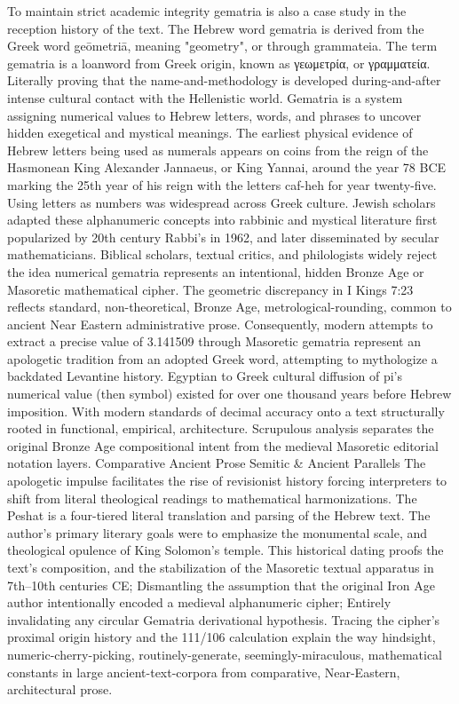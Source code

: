 To maintain strict academic integrity gematria is also a case study in the reception history of the text. The Hebrew word gematria is derived from the Greek word geōmetriā, meaning "geometry", or through grammateia. The term gematria is a loanword from Greek origin, known as γεωμετρία, or γραμματεία. Literally proving that the name-and-methodology is developed during-and-after intense cultural contact with the Hellenistic world. Gematria is a system assigning numerical values to Hebrew letters, words, and phrases to uncover hidden exegetical and mystical meanings. The earliest physical evidence of Hebrew letters being used as numerals appears on coins from the reign of the Hasmonean King Alexander Jannaeus, or King Yannai, around the year 78 BCE marking the 25th  year of his reign with the letters caf-heh for year twenty-five. Using letters as numbers was widespread across Greek culture. 
Jewish scholars adapted these alphanumeric concepts into rabbinic and mystical literature first popularized by 20th century Rabbi’s in 1962, and later disseminated by secular mathematicians. Biblical scholars, textual critics, and philologists widely reject the idea numerical gematria represents an intentional, hidden Bronze Age or Masoretic mathematical cipher. The geometric discrepancy in I Kings 7:23 reflects standard, non-theoretical, Bronze Age, metrological-rounding, common to ancient Near Eastern administrative prose. Consequently, modern attempts to extract a precise value of 3.141509 through Masoretic gematria represent an apologetic tradition from an adopted Greek word, attempting to mythologize a backdated Levantine history. Egyptian to Greek cultural diffusion of pi’s numerical value (then symbol) existed for over one thousand years before Hebrew imposition. With modern standards of decimal accuracy onto a text structurally rooted in functional, empirical, architecture. Scrupulous analysis separates the original Bronze Age compositional intent from the medieval Masoretic editorial notation layers.
Comparative Ancient Prose Semitic & Ancient Parallels
The apologetic impulse facilitates the rise of revisionist history forcing interpreters to shift from literal theological readings to mathematical harmonizations. The Peshat is a four-tiered literal translation and parsing of the Hebrew text. The author’s primary literary goals were to emphasize the monumental scale, and theological opulence of King Solomon’s temple. This historical dating proofs the text's composition, and the stabilization of the Masoretic textual apparatus in 7th–10th centuries CE; Dismantling the assumption that the original Iron Age author intentionally encoded a medieval alphanumeric cipher; Entirely invalidating any circular Gematria derivational hypothesis. Tracing the cipher’s proximal origin history and the 111/106 calculation explain the way hindsight, numeric-cherry-picking, routinely-generate, seemingly-miraculous, mathematical constants in large ancient-text-corpora from comparative, Near-Eastern, architectural prose. 
